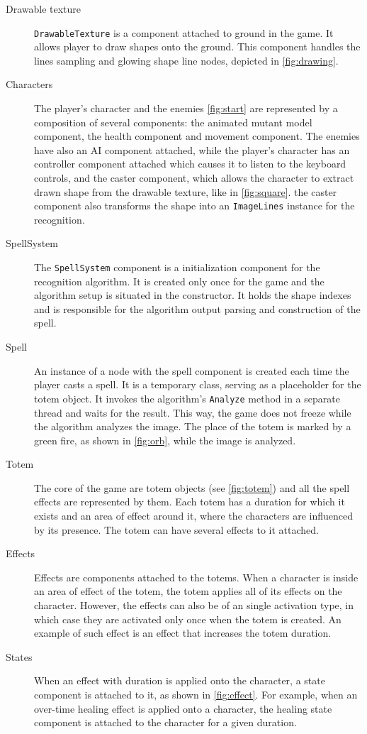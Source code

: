 \begin{description}
\item [Drawable texture] \texttt{DrawableTexture} is a component attached to ground in the game. It allows player to draw shapes onto the ground. This component handles the lines sampling and glowing shape line nodes, depicted in \cref{fig:drawing}.

\item [Characters] The player's character and the enemies \ref{fig:start} are represented by a composition of several components: the animated mutant model component, the health component and movement component. The enemies have also an AI component attached, while the player's character has an controller component attached which causes it to listen to the keyboard controls, and the caster component, which allows the character to extract drawn shape from the drawable texture, like in \cref{fig:square}. the caster component also transforms the shape into an \texttt{ImageLines} instance for the recognition.

\item [SpellSystem] The \texttt{SpellSystem} component is a initialization component for the recognition algorithm. It is created only once for the game and the algorithm setup is situated in the constructor. It holds the shape indexes and is responsible for the algorithm output parsing and construction of the spell.

\item [Spell] An instance of a node with the spell component is created each time the player casts a spell. It is a temporary class, serving as a placeholder for the totem object. It invokes the algorithm's \texttt{Analyze} method in a separate thread and waits for the result. This way, the game does not freeze while the algorithm analyzes the image. The place of the totem is marked by a green fire, as shown in \cref{fig:orb}, while the image is analyzed. 

\item [Totem] The core of the game are totem objects (see \cref{fig:totem}) and all the spell effects are represented by them. Each totem has a duration for which it exists and an area of effect around it, where the characters are influenced by its presence. The totem can have several effects to it attached. 

\item [Effects]  Effects are components attached to the totems. When a character is inside an area of effect of the totem, the totem applies all of its effects on the character. However, the effects can also be of an single activation type, in which case they are activated only once when the totem is created. An example of such effect is an effect that increases the totem duration.

\item [States] When an effect with duration is applied onto the character, a state component is attached to it, as shown in \cref{fig:effect}. For example, when an over-time healing effect is applied onto a character, the healing state component is attached to the character for a given duration.

\end{description}

